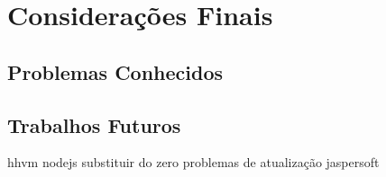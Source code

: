 \chapter{Considerações Finais}\label{consideracoes-finais}

\section{Problemas Conhecidos}

\section{Trabalhos Futuros}
hhvm
nodejs
substituir do zero
problemas de atualização
jaspersoft
